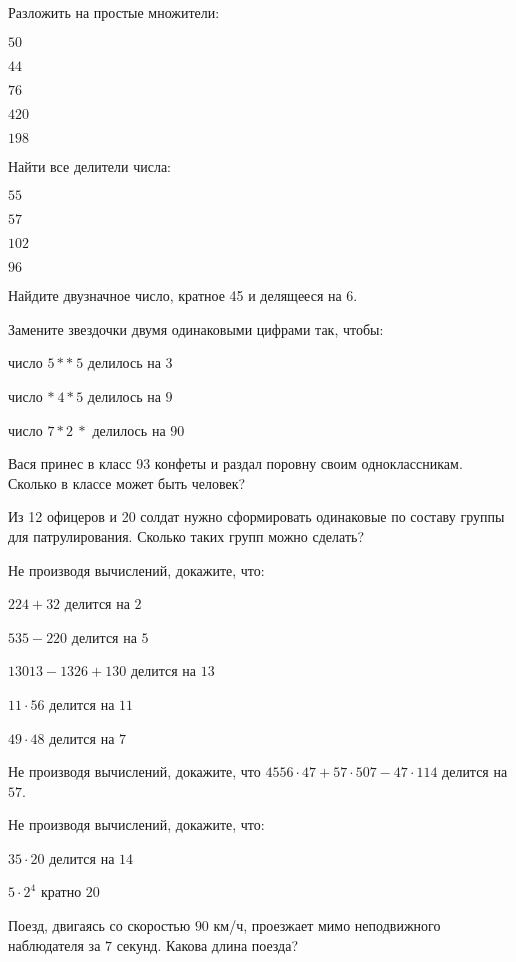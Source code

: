 \begin{listofex}
	\item Разложить на простые множители:
	\begin{enumcols}[itemcolumns=5]
		\item \( 50 \)
		\item \( 44 \)
		\item \( 76 \)
		\item \( 420 \)
		\item \( 198 \)
	\end{enumcols}
	\item Найти все делители числа:
	\begin{enumcols}[itemcolumns=4]
		\item \( 55 \)
		\item \( 57 \)
		\item \( 102 \)
		\item \( 96 \)
	\end{enumcols}
	\item Найдите двузначное число, кратное 45 и делящееся на 6.
	\item Замените звездочки двумя одинаковыми цифрами так, чтобы:
	\begin{enumcols}[itemcolumns=1]
		\item число \( 5**\:5 \) делилось на \( 3 \)
		\item число \( *\:4*5 \) делилось на \( 9 \)
		\item число \( 7*2\:* \) делилось на \( 90 \)
	\end{enumcols}
	\item Вася принес в класс 93 конфеты и раздал поровну своим одноклассникам. Сколько в классе может быть человек?
	\item Из 12 офицеров и 20 солдат нужно сформировать одинаковые по составу группы для патрулирования. Сколько таких групп можно сделать?
	\item Не производя вычислений, докажите, что:
	\begin{enumcols}[itemcolumns=2]
		\item \( 224+32 \) делится на \( 2 \)
		\item \( 535-220 \) делится на \( 5 \)
		\item \( 13013-1326+130 \) делится на \( 13 \)
		\item \( 11\cdot56 \) делится на \( 11 \)
		\item \( 49\cdot48 \) делится на \( 7 \)
	\end{enumcols}
	\item Не производя вычислений, докажите, что \( 4556\cdot47+57\cdot507-47\cdot114 \) делится на \( 57 \).
	\item Не производя вычислений, докажите, что:
	\begin{enumcols}[itemcolumns=2]
		\item \( 35\cdot20 \) делится на \( 14 \)
		\item \( 5\cdot2^4 \) кратно \( 20 \)
	\end{enumcols}
	\item Поезд, двигаясь со скоростью \( 90 \) км/ч, проезжает мимо неподвижного наблюдателя за \( 7 \) секунд. Какова длина поезда?
\end{listofex}
